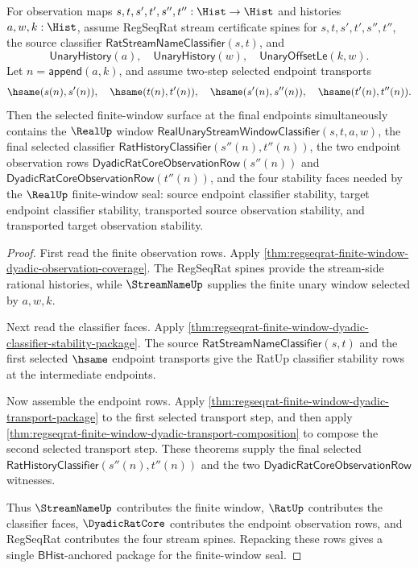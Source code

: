 \begin{theorem}
\label{thm:regseqrat-finite-window-dyadic-closure-package}
For observation maps $s,t,s',t',s'',t'':\Hist\to\Hist$ and histories
$a,w,k:\Hist$, assume RegSeqRat stream certificate spines for
$s,t,s',t',s'',t''$, the source classifier
$\mathsf{RatStreamNameClassifier}(s,t)$, and
$$
\mathsf{UnaryHistory}(a),\quad
\mathsf{UnaryHistory}(w),\quad
\mathsf{UnaryOffsetLe}(k,w).
$$
Let $n=\mathsf{append}(a,k)$, and assume two-step selected endpoint transports
$$
\hsame(s(n),s'(n)),\quad
\hsame(t(n),t'(n)),\quad
\hsame(s'(n),s''(n)),\quad
\hsame(t'(n),t''(n)).
$$
Then the selected finite-window surface at the final endpoints simultaneously
contains the $\RealUp$ window
$\mathsf{RealUnaryStreamWindowClassifier}(s,t,a,w)$, the final selected
classifier $\mathsf{RatHistoryClassifier}(s''(n),t''(n))$, the two endpoint
observation rows
$\mathsf{DyadicRatCoreObservationRow}(s''(n))$ and
$\mathsf{DyadicRatCoreObservationRow}(t''(n))$, and the four stability faces
needed by the $\RealUp$ finite-window seal: source endpoint classifier
stability, target endpoint classifier stability, transported source
observation stability, and transported target observation stability.
\end{theorem}
\begin{proof}
First read the finite observation rows. Apply
\autoref{thm:regseqrat-finite-window-dyadic-observation-coverage}. The
RegSeqRat spines provide the stream-side rational histories, while
$\StreamNameUp$ supplies the finite unary window selected by $a,w,k$.

Next read the classifier faces. Apply
\autoref{thm:regseqrat-finite-window-dyadic-classifier-stability-package}.
The source $\mathsf{RatStreamNameClassifier}(s,t)$ and the first selected
$\hsame$ endpoint transports give the RatUp classifier stability rows at the
intermediate endpoints.

Now assemble the endpoint rows. Apply
\autoref{thm:regseqrat-finite-window-dyadic-transport-package} to the first
selected transport step, and then apply
\autoref{thm:regseqrat-finite-window-dyadic-transport-composition} to compose
the second selected transport step. These theorems supply the final selected
$\mathsf{RatHistoryClassifier}(s''(n),t''(n))$ and the two
$\mathsf{DyadicRatCoreObservationRow}$ witnesses.

Thus $\StreamNameUp$ contributes the finite window, $\RatUp$ contributes the
classifier faces, $\DyadicRatCore$ contributes the endpoint observation rows,
and RegSeqRat contributes the four stream spines. Repacking these rows gives a
single $\mathsf{BHist}$-anchored package for the finite-window seal.
\end{proof}

